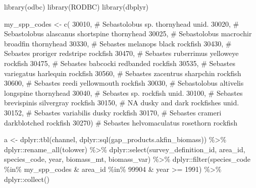 \documentclass[
  letterpaper,
  oneside,
  open=any]{scrbook}
\newenvironment{Shaded}{\begin{snugshade}}{\end{snugshade}}
\newcommand{\CommentTok}[1]{\textcolor[rgb]{0.37,0.37,0.37}{#1}}
\newcommand{\DecValTok}[1]{\textcolor[rgb]{0.68,0.00,0.00}{#1}}
\newcommand{\FunctionTok}[1]{\textcolor[rgb]{0.28,0.35,0.67}{#1}}
\newcommand{\NormalTok}[1]{\textcolor[rgb]{0.00,0.23,0.31}{#1}}
\newcommand{\OtherTok}[1]{\textcolor[rgb]{0.00,0.23,0.31}{#1}}
\newcommand{\SpecialCharTok}[1]{\textcolor[rgb]{0.37,0.37,0.37}{#1}}
\newcommand{\StringTok}[1]{\textcolor[rgb]{0.13,0.47,0.30}{#1}}
\begin{document}
\begin{Shaded}
\begin{Highlighting}[]
\FunctionTok{library}\NormalTok{(odbc)}
\FunctionTok{library}\NormalTok{(RODBC)}
\FunctionTok{library}\NormalTok{(dbplyr)}

\NormalTok{my\_spp\_codes }\OtherTok{\textless{}{-}} \FunctionTok{c}\NormalTok{(}
  \DecValTok{30010}\NormalTok{, }\CommentTok{\#  Sebastolobus sp.    thornyhead unid.}
  \DecValTok{30020}\NormalTok{, }\CommentTok{\#  Sebastolobus alascanus  shortspine thornyhead}
  \DecValTok{30025}\NormalTok{, }\CommentTok{\#  Sebastolobus macrochir  broadfin thornyhead}
  \DecValTok{30330}\NormalTok{, }\CommentTok{\#  Sebastes melanops   black rockfish}
  \DecValTok{30430}\NormalTok{, }\CommentTok{\#  Sebastes proriger   redstripe rockfish}
  \DecValTok{30470}\NormalTok{, }\CommentTok{\#  Sebastes ruberrimus yelloweye rockfish}
  \DecValTok{30475}\NormalTok{, }\CommentTok{\#  Sebastes babcocki   redbanded rockfish}
  \DecValTok{30535}\NormalTok{, }\CommentTok{\#  Sebastes variegatus harlequin rockfish}
  \DecValTok{30560}\NormalTok{, }\CommentTok{\# Sebastes zacentrus   sharpchin rockfish}
  \DecValTok{30600}\NormalTok{, }\CommentTok{\# Sebastes reedi   yellowmouth rockfish}
  \DecValTok{30030}\NormalTok{, }\CommentTok{\# Sebastolobus altivelis   longspine thornyhead}
  \DecValTok{30040}\NormalTok{, }\CommentTok{\# Sebastes sp. rockfish unid.}
  \DecValTok{30100}\NormalTok{, }\CommentTok{\# Sebastes brevispinis silvergray rockfish}
  \DecValTok{30150}\NormalTok{, }\CommentTok{\# NA   dusky and dark rockfishes unid.}
  \DecValTok{30152}\NormalTok{, }\CommentTok{\# Sebastes variabilis  dusky rockfish}
  \DecValTok{30170}\NormalTok{, }\CommentTok{\# Sebastes crameri darkblotched rockfish}
  \DecValTok{30270}\NormalTok{) }\CommentTok{\# Sebastes helvomaculatus  rosethorn rockfish}

\NormalTok{a }\OtherTok{\textless{}{-}}\NormalTok{ dplyr}\SpecialCharTok{::}\FunctionTok{tbl}\NormalTok{(channel, dplyr}\SpecialCharTok{::}\FunctionTok{sql}\NormalTok{(}\StringTok{\textquotesingle{}gap\_products.akfin\_biomass\textquotesingle{}}\NormalTok{)) }\SpecialCharTok{\%\textgreater{}\%} 
\NormalTok{  dplyr}\SpecialCharTok{::}\FunctionTok{rename\_all}\NormalTok{(tolower) }\SpecialCharTok{\%\textgreater{}\%} 
\NormalTok{  dplyr}\SpecialCharTok{::}\FunctionTok{select}\NormalTok{(survey\_definition\_id, area\_id, species\_code, year, biomass\_mt, biomass\_var) }\SpecialCharTok{\%\textgreater{}\%} 
\NormalTok{  dplyr}\SpecialCharTok{::}\FunctionTok{filter}\NormalTok{(species\_code }\SpecialCharTok{\%in\%}\NormalTok{ my\_spp\_codes }\SpecialCharTok{\&} 
\NormalTok{                  area\_id }\SpecialCharTok{\%in\%} \DecValTok{99904} \SpecialCharTok{\&} 
\NormalTok{                  year }\SpecialCharTok{\textgreater{}=} \DecValTok{1991}\NormalTok{) }\SpecialCharTok{\%\textgreater{}\%} 
\NormalTok{  dplyr}\SpecialCharTok{::}\FunctionTok{collect}\NormalTok{() }


\end{Highlighting}
\end{Shaded}
\end{document}

